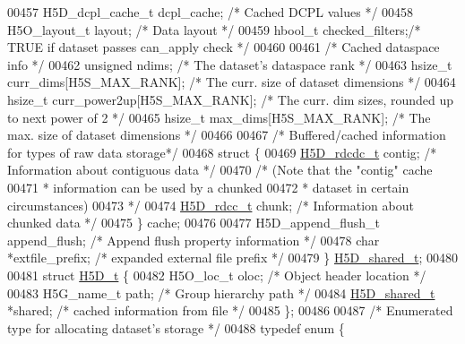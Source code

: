 \begin{DoxyCode}
00457     H5D\_dcpl\_cache\_t    dcpl\_cache;     \textcolor{comment}{/* Cached DCPL values */}
00458     H5O\_layout\_t        layout;         \textcolor{comment}{/* Data layout                  */}
00459     hbool\_t             checked\_filters;\textcolor{comment}{/* TRUE if dataset passes can\_apply check */}
00460 
00461     \textcolor{comment}{/* Cached dataspace info */}
00462     \textcolor{keywordtype}{unsigned}            ndims;          \textcolor{comment}{/* The dataset's dataspace rank */}
00463     hsize\_t             curr\_dims[H5S\_MAX\_RANK];    \textcolor{comment}{/* The curr. size of dataset dimensions */}
00464     hsize\_t             curr\_power2up[H5S\_MAX\_RANK];    \textcolor{comment}{/* The curr. dim sizes, rounded up to next power of
       2 */}
00465     hsize\_t             max\_dims[H5S\_MAX\_RANK];     \textcolor{comment}{/* The max. size of dataset dimensions */} 
00466 
00467     \textcolor{comment}{/* Buffered/cached information for types of raw data storage*/}
00468     \textcolor{keyword}{struct }\{
00469         \hyperlink{struct_h5_d__rdcdc__t}{H5D\_rdcdc\_t}     contig;         \textcolor{comment}{/* Information about contiguous data */}
00470                                         \textcolor{comment}{/* (Note that the "contig" cache}
00471 \textcolor{comment}{                                         * information can be used by a chunked}
00472 \textcolor{comment}{                                         * dataset in certain circumstances)}
00473 \textcolor{comment}{                                         */}
00474         \hyperlink{struct_h5_d__rdcc__t}{H5D\_rdcc\_t}      chunk;          \textcolor{comment}{/* Information about chunked data */}
00475     \} cache;
00476 
00477     H5D\_append\_flush\_t  append\_flush;   \textcolor{comment}{/* Append flush property information */}
00478     \textcolor{keywordtype}{char}                *extfile\_prefix; \textcolor{comment}{/* expanded external file prefix */}
00479 \} \hyperlink{struct_h5_d__shared__t}{H5D\_shared\_t};
00480 
00481 \textcolor{keyword}{struct }\hyperlink{struct_h5_d__t}{H5D\_t} \{
00482     H5O\_loc\_t           oloc;           \textcolor{comment}{/* Object header location       */}
00483     H5G\_name\_t          path;           \textcolor{comment}{/* Group hierarchy path         */}
00484     \hyperlink{struct_h5_d__shared__t}{H5D\_shared\_t}        *shared;        \textcolor{comment}{/* cached information from file */}
00485 \};
00486 
00487 \textcolor{comment}{/* Enumerated type for allocating dataset's storage */}
00488 \textcolor{keyword}{typedef} \textcolor{keyword}{enum} \{

\end{DoxyCode}
